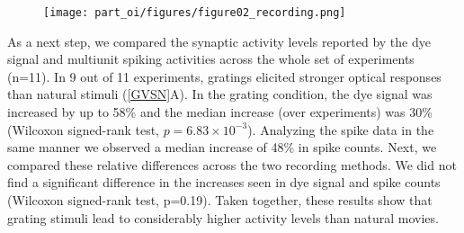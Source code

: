 \begin{figure}[!htb] \centerline{
\label{recording}\texttt{[image: part\_oi/figures/figure02\_recording.png]} }
 \caption{\protect}\end{figure} 






As a next step, we compared the synaptic activity levels reported by the
dye signal and multiunit spiking activities across the whole set of
experiments (n=11). In 9 out of 11 experiments, gratings elicited stronger
optical responses than natural stimuli (\ref{GVSN}A). In the grating
condition, the dye signal was increased by up to 58\% and the median
increase (over experiments) was 30\% (Wilcoxon signed-rank test,
$p=6.83\times10^{-3}$).  Analyzing the spike data in the same manner we
observed a median increase of 48\% in spike counts. Next, we compared these
relative differences across the two recording methods. We did not find a
significant difference in the increases seen in dye signal and spike counts
(Wilcoxon signed-rank test, p=0.19). Taken together, these results show
that grating stimuli lead to considerably higher activity levels than
natural movies.


